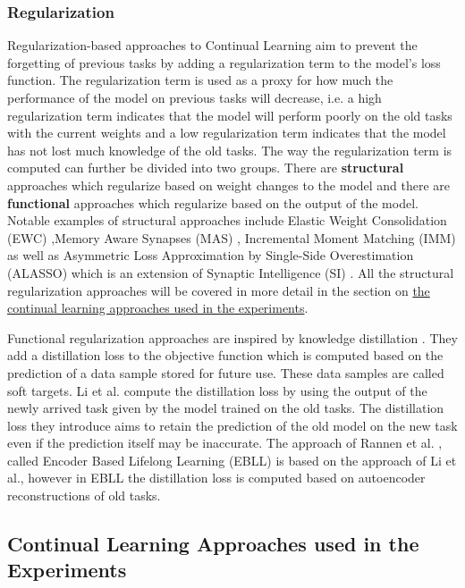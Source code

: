 \subsubsection{Regularization}
Regularization-based approaches to Continual Learning aim to prevent the forgetting of previous tasks by adding a regularization
term to the model's loss function. The regularization term is used as a proxy for how much the performance of the model on previous
tasks will decrease, i.e. a high regularization term indicates that the model will perform poorly on the old tasks with the current
weights and a low regularization term indicates that the model has not lost much knowledge of the old tasks. The way the
regularization term is computed can further be divided into two groups. There are \textbf{structural} approaches which regularize
based on weight changes to the model and there are \textbf{functional} approaches which regularize based on the output of the model.
Notable examples of structural approaches include Elastic Weight Consolidation (EWC) \cite{kirkpatrick2017overcoming},Memory Aware
Synapses (MAS) \cite{aljundi2018memory}, Incremental Moment Matching (IMM) \cite{lee2017overcoming} as well as Asymmetric Loss
Approximation by Single-Side Overestimation (ALASSO) \cite{park2019continual} which is an extension of Synaptic Intelligence (SI)
\cite{zenke2017continual}. All the structural regularization approaches will be covered in more detail in the section on
\hyperref[sec:Related_work:Continual_Learning:Experiments]{the continual learning approaches used in the experiments}. \par
Functional regularization approaches are inspired by knowledge distillation \cite{hinton2015distilling}. They add a distillation
loss to the objective function which is computed based on the prediction of a data sample stored for future use. These data samples
are called soft targets. Li et al. \cite{li2017learning} compute the distillation loss by using the output of the newly arrived task
given by the model trained on the old tasks. The distillation loss they introduce aims to retain the prediction of the old model on
the new task even if the prediction itself may be inaccurate. The approach of Rannen et al.
\cite{rannen2017encoder}, called Encoder Based Lifelong Learning (EBLL) is based on the approach of Li et al., however in EBLL the
distillation loss is computed based on autoencoder reconstructions of old tasks.
\subsection{Continual Learning Approaches used in the Experiments}
\label{sec:Related_work:Continual_Learning:Experiments}

